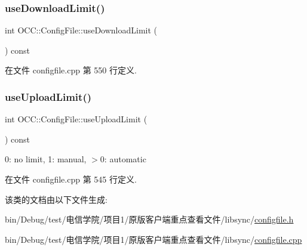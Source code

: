 \mbox{\label{class_o_c_c_1_1_config_file_a08c88fb88637d43c1f26945057fc7ed3}} 
\subsubsection{\texorpdfstring{use\+Download\+Limit()}{useDownloadLimit()}}
{\footnotesize\ttfamily int O\+C\+C\+::\+Config\+File\+::use\+Download\+Limit (\begin{DoxyParamCaption}{ }\end{DoxyParamCaption}) const}



在文件 configfile.\+cpp 第 550 行定义.

\mbox{\label{class_o_c_c_1_1_config_file_a448af0807e52e830d4964481054b2e97}} 
\subsubsection{\texorpdfstring{use\+Upload\+Limit()}{useUploadLimit()}}
{\footnotesize\ttfamily int O\+C\+C\+::\+Config\+File\+::use\+Upload\+Limit (\begin{DoxyParamCaption}{ }\end{DoxyParamCaption}) const}

0\+: no limit, 1\+: manual, $>$0\+: automatic 

在文件 configfile.\+cpp 第 545 行定义.



该类的文档由以下文件生成\+:\begin{DoxyCompactItemize}
\item 
bin/\+Debug/test/电信学院/项目1/原版客户端重点查看文件/libsync/\hyperlink{configfile_8h}{configfile.\+h}\item 
bin/\+Debug/test/电信学院/项目1/原版客户端重点查看文件/libsync/\hyperlink{configfile_8cpp}{configfile.\+cpp}\end{DoxyCompactItemize}
